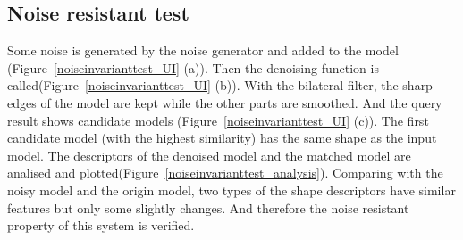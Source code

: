 \subsection{Noise resistant test}

Some noise is generated by the noise generator and added to the model (Figure~\ref{noiseinvarianttest_UI} (a)). Then the denoising function is called(Figure~\ref{noiseinvarianttest_UI} (b)). With the bilateral filter, the sharp edges of the model are kept while the other parts are smoothed. And the query result shows candidate models (Figure~\ref{noiseinvarianttest_UI} (c)). The first candidate model (with the highest similarity) has the same shape as the input model. The descriptors of the denoised model and the matched model are　analised and plotted(Figure~\ref{noiseinvarianttest_analysis}). Comparing with the noisy model and the origin model, two types of the shape descriptors have similar features but only some slightly changes. And therefore the noise resistant property of this system is verified. 

